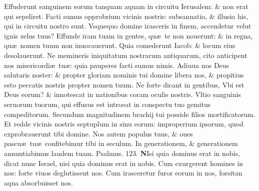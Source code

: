 \documentclass[a5paper,10pt]{book}
\def\ae{æ}
\begin{document}
\begin{multicols*}{2}
\newline \color{red} E\color{black}ffuderunt sanguinem eorum tanquam aquam in circuitu Ierusalem: \& non erat qui sepeliret.
\newline \color{red} F\color{black}acti sumus opprobrium vicinis nostris: subsannatio, \& illusio his, qui in circuitu nostro sunt.
\newline \color{red} V\color{black}squequo domine irasceris in finem, accendetur velut ignis zelus tuus?
\newline \color{red} E\color{black}ffunde iram tuam in gentes, qu\ae \ te non nouerunt: \& in regna, qu\ae \ nomen tuum non inuocauerunt.
\newline \color{red} Q\color{black}uia comederunt Iacob: \& locum eius desolauerunt.
\newline \color{red} N\color{black}e memineris iniquitatum nostrarum antiquarum, cito anticipent nos misericordi\ae \ tu\ae : quia pauperes facti sumus nimis.
\newline \color{red} A\color{black}diuua nos Deus salutaris noster: \& propter gloriam nominis tui domine libera nos, \& propitius esto peccatis nostris propter nomen tuum.
\newline \color{red} N\color{black}e forte dicant in gentibus, Vbi est Deus eorum? \& innotescat in nationibus coram oculis nostris.
\newline \color{red} V\color{black}ltio sanguinis seruorum tuorum, qui effusus est introeat in conspectu tuo gemitus compeditorum.
\newline \color{red} S\color{black}ecundum magnitudinem brachij tui posside filios mortificatorum.
\newline \color{red} E\color{black}t redde vicinis nostris septuplum in sinu eorum: improperium ipsorum, quod exprobrauerunt tibi domine.
\newline \color{red} N\color{black}os autem populus tuus, \& oues pascu\ae \ tu\ae \ confitebimur tibi in seculum.
\newline \color{red} I\color{black}n generationem, \& generationem annuntiabimus laudem tuam.
\newline \color{red} Psalmus. \hypertarget{ps123}{123.} \color{black}
\lettrine[lines=2]{\bfseries \color{red} N}{}Isi quia dominus erat in nobis, dicat nunc Israel, nisi quia dominus erat in nobis.
\newline \color{red} C\color{black}um exurgerent homines in nos: forte viuos deglutissent nos.
\newline \color{red} C\color{black}um irasceretur furor eorum in nos, forsitan aqua absorbuisset nos.

\end{multicols*}
\end{document}
